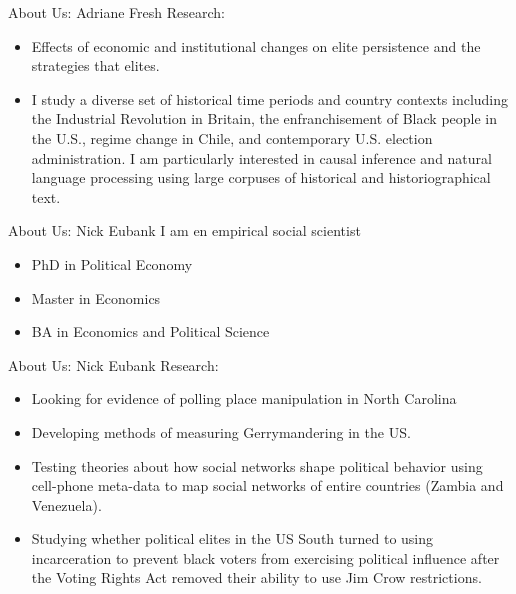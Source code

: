 \documentclass[11pt]{beamer}
\begin{document}
\begin{frame}[c]{About Us: Adriane Fresh}
	Research:
	\begin{itemize}
		\pause \item Effects of economic and institutional changes on elite persistence and the strategies that elites.
		\pause \item I study a diverse set of historical time periods and country contexts including the Industrial Revolution in Britain, the enfranchisement of Black people in the U.S., regime change in Chile, and contemporary U.S. election administration. 
		\pause I am particularly interested in causal inference and natural language processing using large corpuses of historical and historiographical text.
	\end{itemize}
\end{frame}



\begin{frame}[c]{About Us: Nick Eubank}
	I am en empirical social scientist\\
	\vspace{0.5cm}
	\begin{itemize}
		\pause \item PhD in Political Economy
		\pause \item Master in Economics
		\pause \item BA in Economics and Political Science
	\end{itemize}
\end{frame}

\begin{frame}[c]{About Us: Nick Eubank}
	Research:
	\begin{itemize}
		\pause \item Looking for evidence of polling place manipulation in North Carolina
		\pause \item Developing methods of measuring Gerrymandering in the US.
		\pause \item Testing theories about how social networks shape political behavior using cell-phone meta-data to map social networks of entire countries (Zambia and Venezuela).
		\pause \item Studying whether political elites in the US South turned to using incarceration to prevent black voters from exercising political influence after the Voting Rights Act removed their ability to use Jim Crow restrictions.
	\end{itemize}
\end{frame}
\end{document}
